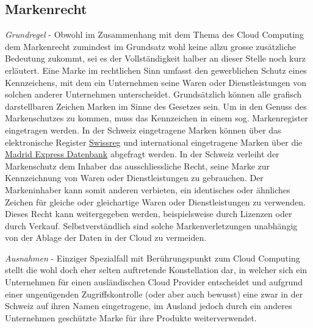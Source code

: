 \documentclass[a4paper,pointlessnumbers]{scrreprt}
\begin{document}
\subsection{Markenrecht}
\textit{Grundregel} - Obwohl im Zusammenhang mit dem Thema des Cloud Computing dem Markenrecht zumindest im Grundsatz wohl keine allzu grosse zusätzliche Bedeutung zukommt, sei es der Vollständigkeit halber an dieser Stelle noch kurz erläutert. Eine Marke im rechtlichen Sinn umfasst den gewerblichen Schutz eines Kennzeichens, mit dem ein Unternehmen seine Waren oder Dienstleistungen von solchen anderer Unternehmen unterscheidet. Grundsätzlich können alle grafisch darstellbaren Zeichen Marken im Sinne des Gesetzes sein. Um in den Genuss des Markenschutzes zu kommen, muss das Kennzeichen in einem sog. Markenregister eingetragen werden. In der Schweiz eingetragene Marken können über das elektronische Register \href{https://www.swissreg.ch/srclient/faces/jsp/start.jsp}{Swissreg} und international eingetragene Marken über die \href{http://www.wipo.int/branddb/en/}{Madrid Express Datenbank} abgefragt werden. In der Schweiz verleiht der Markenschutz dem Inhaber das ausschliessliche Recht, seine Marke zur Kennzeichnung von Waren oder Dienstleistungen zu gebrauchen. Der Markeninhaber kann somit anderen verbieten, ein identisches oder ähnliches Zeichen für gleiche oder gleichartige Waren oder Dienstleistungen zu verwenden. Dieses Recht kann weitergegeben werden, beispielsweise durch Lizenzen oder durch Verkauf. Selbstverständlich sind solche Markenverletzungen unabhängig von der Ablage der Daten in der Cloud zu vermeiden.

\textit{Ausnahmen} - Einziger Spezialfall mit Berührungspunkt zum Cloud Computing stellt die wohl doch eher selten auftretende Konstellation dar, in welcher sich ein Unternehmen für einen ausländischen Cloud Provider entscheidet und aufgrund einer ungenügenden Zugriffskontrolle (oder aber auch bewusst) eine zwar in der Schweiz auf ihren Namen eingetragene, im Ausland jedoch durch ein anderes Unternehmen geschützte Marke für ihre Produkte weiterverwendet.
\end{document}
